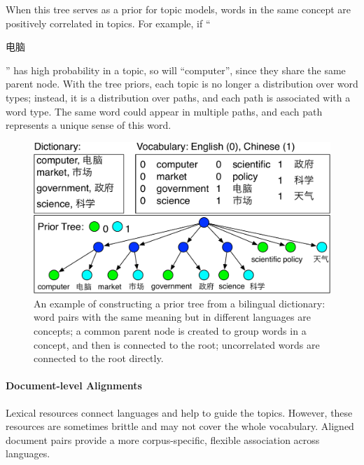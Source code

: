 
When this tree serves as a prior for topic models, words in the same
concept are positively correlated in topics.  For example, if
``\begin{CJK*}{UTF8}{gbsn}电脑\end{CJK*}'' has high probability in a
  topic, so will ``computer'', since they share the same parent
  node. With the tree priors, each topic is no longer a distribution
  over word types; instead, it is a distribution over paths, and each
  path is associated with a word type.  The same word could appear in
  multiple paths, and each path represents a unique sense of this
  word.

\begin{figure}
\centering
\includegraphics[width=0.9\linewidth]{figures/correlations_tree-crop.pdf}
\vspace{-3mm}
\caption[Constructing prior tree from a bilingual dictionary]{An example of constructing a prior tree from a
  bilingual dictionary: word pairs with the same meaning but in
  different languages are concepts; a common parent node is created to
  group words in a concept, and then is connected to the root;
  uncorrelated words are connected to the root directly.}
\label{fig:prior_trees}
\end{figure}


\paragraph{\bf Document-level Alignments}

Lexical resources connect languages and help to guide the
topics. However, these resources are sometimes brittle and may not
cover the whole vocabulary. Aligned document pairs provide a more
corpus-specific, flexible association across languages.

